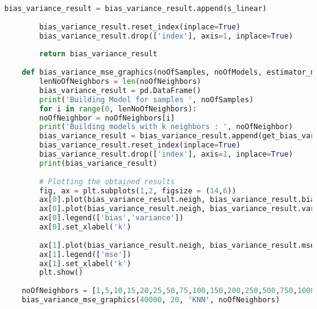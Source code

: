 \documentclass[a4paper]{article}
\begin{document}
\begin{appendices}
\begin{lstlisting}[language=Python]
		bias_variance_result = bias_variance_result.append(s_linear)
		
		bias_variance_result.reset_index(inplace=True)
		bias_variance_result.drop(['index'], axis=1, inplace=True)
		
		return bias_variance_result
	
	def bias_variance_mse_graphics(noOfSamples, noOfModels, estimator_name, noOfNeighbors) :
		lenNoOfNeighbors = len(noOfNeighbors)
		bias_variance_result = pd.DataFrame()
		print('Building Model for samples ', noOfSamples)
		for i in range(0, lenNoOfNeighbors):
		noOfNeighbor = noOfNeighbors[i]
		print('Building models with k neighbors : ', noOfNeighbor)
		bias_variance_result = bias_variance_result.append(get_bias_variance(40000,noOfModels, estimator_name, noOfNeighbor))
		bias_variance_result.reset_index(inplace=True)
		bias_variance_result.drop(['index'], axis=1, inplace=True)
		print(bias_variance_result)
		
		# Plotting the obtained results
		fig, ax = plt.subplots(1,2, figsize = (14,6))
		ax[0].plot(bias_variance_result.neigh, bias_variance_result.bias)
		ax[0].plot(bias_variance_result.neigh, bias_variance_result.variance)
		ax[0].legend(['bias','variance'])
		ax[0].set_xlabel('k')
		
		ax[1].plot(bias_variance_result.neigh, bias_variance_result.mse)
		ax[1].legend(['mse'])
		ax[1].set_xlabel('k')
		plt.show()
	
	noOfNeighbors = [1,5,10,15,20,25,50,75,100,150,200,250,500,750,1000,2000]
	bias_variance_mse_graphics(40000, 20, 'KNN', noOfNeighbors)
\end{lstlisting}

\end{appendices}

\newpage
\end{document}
